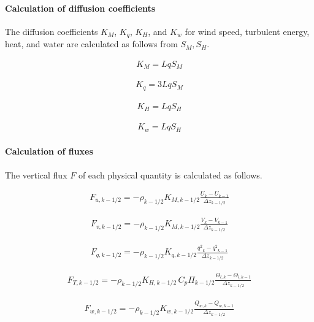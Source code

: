 \hypertarget{calculation-of-diffusion-coefficients-1}{%
\paragraph{Calculation of diffusion
coefficients}\label{calculation-of-diffusion-coefficients-1}}

The diffusion coefficients \(K_M\), \(K_q\), \(K_H\), and \(K_w\) for
wind speed, turbulent energy, heat, and water are calculated as follows
from \(S_M,S_H\).

\begin{eqnarray}K_M=LqS_M\end{eqnarray}

\begin{eqnarray}K_q=3LqS_M\end{eqnarray}

\begin{eqnarray}K_H=LqS_H\end{eqnarray}

\begin{eqnarray}K_w=LqS_H\end{eqnarray}

\hypertarget{calculation-of-fluxes}{%
\paragraph{Calculation of fluxes}\label{calculation-of-fluxes}}

The vertical flux \(F\) of each physical quantity is calculated as
follows.

\begin{eqnarray}F_{u,k-1/2}=-\rho_{k-1/2}K_{M,k-1/2}\frac{U_{k}-U_{k-1}}{\Delta z_{k-1/2}}\end{eqnarray}

\begin{eqnarray}F_{v,k-1/2}=-\rho_{k-1/2}K_{M,k-1/2}\frac{V_{k}-V_{k-1}}{\Delta z_{k-1/2}}\end{eqnarray}

\begin{eqnarray}F_{q,k-1/2}=-\rho_{k-1/2}K_{q,k-1/2}\frac{{q^2}_ {k}-{q^2}_ {k-1}}{\Delta z_{k-1/2}}\end{eqnarray}

\begin{eqnarray}F_{T,k-1/2}=-\rho_{k-1/2}K_{H,k-1/2}\,C_p\Pi_{k-1/2}\frac{\Theta_{l,k}-\Theta_{l,k-1}}{\Delta z_{k-1/2}}\end{eqnarray}

\begin{eqnarray}F_{w,k-1/2}=-\rho_{k-1/2}K_{w,k-1/2}\frac{Q_{w,k}-Q_{w,k-1}}{\Delta z_{k-1/2}}\end{eqnarray}

